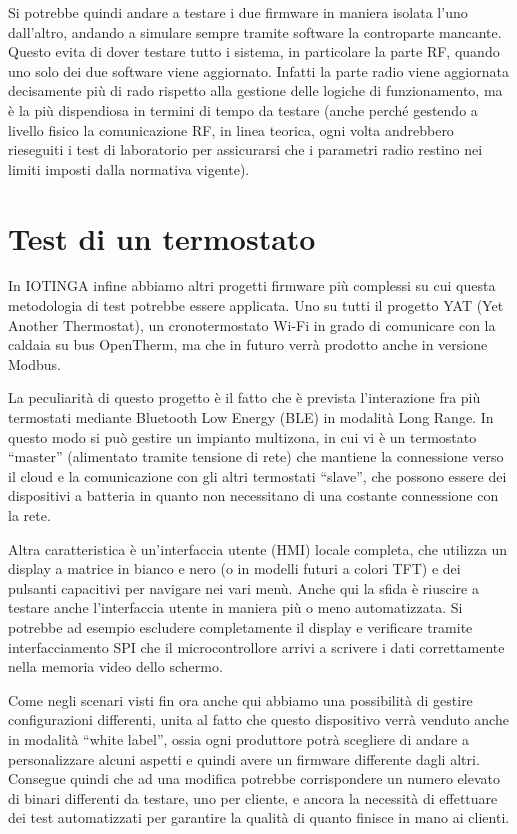 \documentclass[12pt,a4paper,twoside,titlepage]{book}
\begin{document}
Si potrebbe quindi andare a testare i due firmware in maniera isolata l'uno dall'altro,
andando a simulare sempre tramite software la controparte mancante. Questo evita di dover
testare tutto i sistema, in particolare la parte RF, quando uno solo dei due software viene
aggiornato. Infatti la parte radio viene aggiornata decisamente più di rado rispetto alla
gestione delle logiche di funzionamento, ma è la più dispendiosa in termini di tempo da testare
(anche perché gestendo a livello fisico la comunicazione RF, in linea teorica, ogni volta andrebbero
rieseguiti i test di laboratorio per assicurarsi che i parametri radio restino nei limiti
imposti dalla normativa vigente).

\section{Test di un termostato}

In IOTINGA infine abbiamo altri progetti firmware più complessi su cui questa metodologia
di test potrebbe essere applicata. Uno su tutti il progetto YAT (Yet Another Thermostat),
un cronotermostato Wi-Fi in grado di comunicare con la caldaia su bus OpenTherm, ma
che in futuro verrà prodotto anche in versione Modbus.

La peculiarità di questo progetto è il fatto che è prevista l'interazione fra più
termostati mediante Bluetooth Low Energy (BLE) in modalità Long Range. In questo modo
si può gestire un impianto multizona, in cui vi è un termostato ``master'' (alimentato
tramite tensione di rete) che mantiene la connessione verso il cloud e la comunicazione
con gli altri termostati ``slave'', che possono essere dei dispositivi a batteria
in quanto non necessitano di una costante connessione con la rete.

Altra caratteristica è un'interfaccia utente (HMI)
locale completa, che utilizza un display a matrice in bianco e nero (o in modelli
futuri a colori TFT) e dei pulsanti capacitivi per navigare nei vari menù. Anche
qui la sfida è riuscire a testare anche l'interfaccia utente in maniera più o meno
automatizzata. Si potrebbe ad esempio escludere completamente il display e verificare
tramite interfacciamento SPI che il microcontrollore arrivi a scrivere i dati correttamente
nella memoria video dello schermo.

Come negli scenari visti fin ora anche qui abbiamo una possibilità di gestire configurazioni
differenti, unita al fatto che questo dispositivo verrà venduto anche in modalità ``white label'',
ossia ogni produttore potrà scegliere di andare a personalizzare alcuni aspetti e quindi
avere un firmware differente dagli altri. Consegue quindi che ad una modifica potrebbe
corrispondere un numero elevato di binari differenti da testare, uno per cliente, e
ancora la necessità di effettuare dei test automatizzati per garantire la qualità di
quanto finisce in mano ai clienti.
\end{document}
